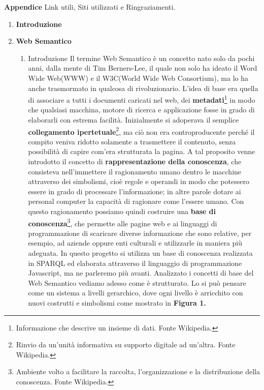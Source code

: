 \documentclass[a4paper,11pt]{article}
\begin{document}
\textbf {Appendice} Link utili, Siti utilizzati e Ringraziamenti.
\newpage
\begin{enumerate}
	\item \LARGE{\textbf{Introduzione}}
	\newpage
	\item \LARGE{\textbf{Web Semantico}}
		\begin{enumerate}[label*=\arabic*.]
			\Large
			 
			\item {Introduzione}\newline
Il termine Web Semantico è un concetto nato solo da pochi anni, dalla mente di Tim Berners-Lee, il quale non solo ha ideato il Word Wide Web(WWW) e il W3C(World Wide Web Consortium), ma lo ha anche trasmormato in qualcosa di rivoluzionario. L'idea di base era quella di associare a tutti i documenti caricati nel web, dei \textbf{metadati}\footnote{Informazione che descrive un insieme di dati. Fonte Wikipedia.} in modo che qualsiasi macchina, motore di ricerca e applicazione fosse in grado di elaborarli con estrema facilità.\newline
Inizialmente si adoperava il semplice \textbf{collegamento ipertetuale}\footnote{Rinvio da un'unità informativa su supporto digitale ad un'altra. Fonte Wikipedia.}, ma ciò non era controproducente perché il compito veniva ridotto solamente a trasmettere il contenuto, senza possibilità di capire com'era strutturata la pagina.
A tal proposito venne introdotto il concetto di \textbf{rappresentazione della conoscenza}, che consisteva nell'immettere il ragionamento umano dentro le macchine attraverso dei simbolismi, cioè regole e operandi in modo che potessero essere in grado di processare l'informazione; in altre parole dotare ai personal computer la capacità di ragionare come l'essere umano.
Con questo ragionamento possiamo quindi costruire una \textbf{base di conoscenza}\footnote{Ambiente volto a facilitare la raccolta, l'organizzazione e la distribuzione della conoscenza. Fonte Wikipedia.}, che permette alle pagine web e ai linguaggi di programmazione di scaricare diverse informazione che sono relative, per esempio, ad aziende oppure enti culturali e utilizzarle in maniera più adeguata. In questo progetto si utilizza un base di conoscenza realizzata in SPARQL ed elaborata attraverso il linguaggio di programmazione Javascript, ma ne parleremo più avanti.\newline
Analizzato i concetti di base del Web Semantico vediamo adesso come è strutturato. Lo si può pensare come un sistema a livelli gerarchico, dove ogni livello è arricchito con nuovi costrutti e simbolismi come mostrato in \textbf{Figura 1.}\newpage

\end{enumerate}
\end{enumerate}
\end{document}
